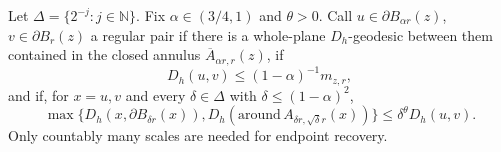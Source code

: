 \documentclass[11pt]{article}
\theoremstyle{definition}
\theoremstyle{remark}
\newcommand{\N}{\mathbb N}
\begin{document}
Let $\Delta=\{2^{-j}:j\in\N\}$. Fix $\alpha\in(3/4,1)$ and
$\theta>0$. Call $u\in\partial B_{\alpha r}(z)$,
$v\in\partial B_r(z)$ a regular pair if there is a whole-plane
$D_h$-geodesic between them contained in the closed annulus
$\overline A_{\alpha r,r}(z)$, if
\begin{equation}\label{eq:regular-length}
               D_h(u,v)\le(1-\alpha)^{-1}m_{z,r},
\end{equation}
and if, for $x=u,v$ and every $\delta\in\Delta$ with
$\delta\le(1-\alpha)^2$,
\begin{equation}\label{eq:regular-endpoints}
 \max\{D_h(x,\partial B_{\delta r}(x)),
       D_h(\mathrm{around}\,A_{\delta r,\sqrt\delta r}(x))\}
                         \le\delta^\theta D_h(u,v).
\end{equation}
Only countably many scales are needed for endpoint recovery.
\end{document}
